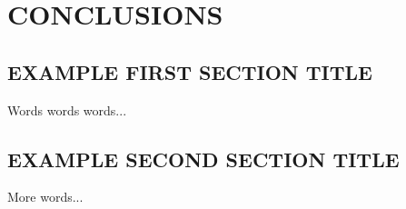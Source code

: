 \chapter{CONCLUSIONS}

\section{EXAMPLE FIRST SECTION TITLE}

Words words words... \par

\section{EXAMPLE SECOND SECTION TITLE}

More words... \par

\pagebreak
